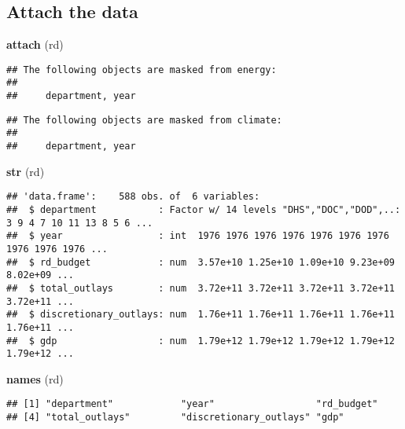 \documentclass[]{article}
\newenvironment{Shaded}{\begin{snugshade}}{\end{snugshade}}
\newcommand{\KeywordTok}[1]{\textcolor[rgb]{0.13,0.29,0.53}{\textbf{#1}}}
\newcommand{\NormalTok}[1]{#1}
\begin{document}
\subsection{Attach the data}\label{attach-the-data}

\begin{Shaded}
\begin{Highlighting}[]
\KeywordTok{attach}\NormalTok{ (rd)}
\end{Highlighting}
\end{Shaded}

\begin{verbatim}
## The following objects are masked from energy:
## 
##     department, year
\end{verbatim}

\begin{verbatim}
## The following objects are masked from climate:
## 
##     department, year
\end{verbatim}

\begin{Shaded}
\begin{Highlighting}[]
\KeywordTok{str}\NormalTok{ (rd)}
\end{Highlighting}
\end{Shaded}

\begin{verbatim}
## 'data.frame':    588 obs. of  6 variables:
##  $ department           : Factor w/ 14 levels "DHS","DOC","DOD",..: 3 9 4 7 10 11 13 8 5 6 ...
##  $ year                 : int  1976 1976 1976 1976 1976 1976 1976 1976 1976 1976 ...
##  $ rd_budget            : num  3.57e+10 1.25e+10 1.09e+10 9.23e+09 8.02e+09 ...
##  $ total_outlays        : num  3.72e+11 3.72e+11 3.72e+11 3.72e+11 3.72e+11 ...
##  $ discretionary_outlays: num  1.76e+11 1.76e+11 1.76e+11 1.76e+11 1.76e+11 ...
##  $ gdp                  : num  1.79e+12 1.79e+12 1.79e+12 1.79e+12 1.79e+12 ...
\end{verbatim}

\begin{Shaded}
\begin{Highlighting}[]
\KeywordTok{names}\NormalTok{ (rd)}
\end{Highlighting}
\end{Shaded}

\begin{verbatim}
## [1] "department"            "year"                  "rd_budget"            
## [4] "total_outlays"         "discretionary_outlays" "gdp"
\end{verbatim}
\end{document}
